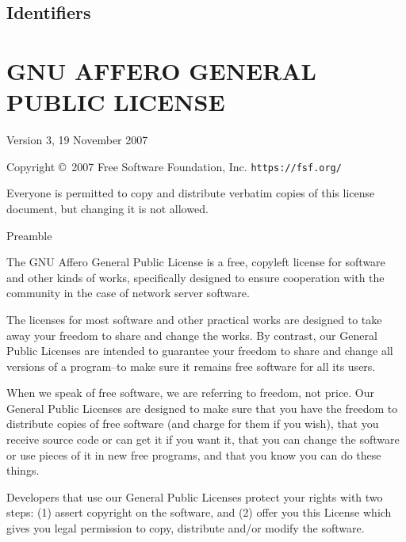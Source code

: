 \documentclass{article}%
\begin{document}
\nowebchunks

\subsection{Identifiers}

\nowebindex

\clearpage
\section{GNU AFFERO GENERAL PUBLIC LICENSE}

\begin{center}
{\parindent 0in

Version 3, 19 November 2007

Copyright \copyright\    2007 Free Software Foundation, Inc. \texttt{https://fsf.org/}

\bigskip
Everyone is permitted to copy and distribute verbatim copies of this
license document, but changing it is not allowed.}

\end{center}

\begin{center}
{\Large \sc Preamble}
\end{center}

The GNU Affero General Public License is a free, copyleft license
for software and other kinds of works, specifically designed to ensure
cooperation with the community in the case of network server software.

The licenses for most software and other practical works are
designed to take away your freedom to share and change the works.        By
contrast, our General Public Licenses are intended to guarantee your
freedom to share and change all versions of a program--to make sure it
remains free software for all its users.

When we speak of free software, we are referring to freedom, not
price.  Our General Public Licenses are designed to make sure that you
have the freedom to distribute copies of free software (and charge for
them if you wish), that you receive source code or can get it if you
want it, that you can change the software or use pieces of it in new
free programs, and that you know you can do these things.

Developers that use our General Public Licenses protect your rights
with two steps: (1) assert copyright on the software, and (2) offer
you this License which gives you legal permission to copy, distribute
and/or modify the software.
\end{document}

